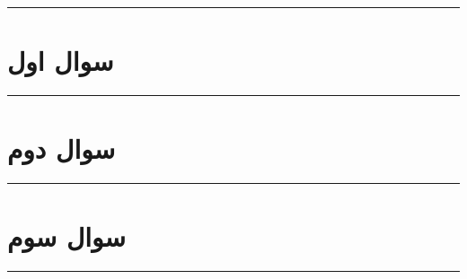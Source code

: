 \documentclass[a4paper,10pt]{article}
\begin{document}
\vspace{8pt}
\textcolor{AccentCyan}{\rule{\linewidth}{0.8pt}}
\section{\textcolor{AccentGold}{سوال اول}}

\bigskip
\bigskip
\textcolor{AccentCyan}{\rule{\linewidth}{0.4pt}}
\section{\textcolor{AccentGold}{سوال دوم}}


\bigskip
\bigskip
\textcolor{AccentCyan}{\rule{\linewidth}{0.4pt}}
\section{\textcolor{AccentGold}{سوال سوم}}


\bigskip
\bigskip
\textcolor{AccentCyan}{\rule{\linewidth}{0.4pt}}


\end{document}
